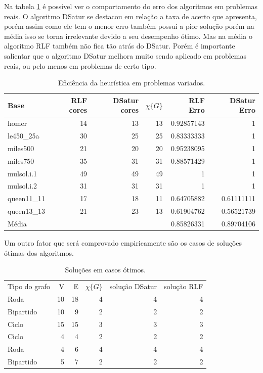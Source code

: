 \documentclass[12pt]{article}
\begin{document}
Na tabela \ref{tab:org9793e95} é possível ver o comportamento do erro dos algoritmos em problemas reais. O algoritmo DSatur se destacou em relação a taxa de acerto que apresenta, porém assim como ele tem o menor erro também possui a pior solução porém na média isso se torna irrelevante devido a seu desempenho ótimo. Mas na média o algoritmo RLF também não fica tão atrás do DSatur. Porém é importante salientar que o algoritmo DSatur melhora muito sendo aplicado em problemas reais, ou pelo menos em problemas de certo tipo.

\begin{table}[htbp]
\centering
\begin{tabular}{lrrrrr}
Base & RLF cores & DSatur cores & \(\chi\{G\}\) & RLF Erro & DSatur Erro\\
\hline
homer & 14 & 13 & 13 & 0.92857143 & 1\\
le450\_25a & 30 & 25 & 25 & 0.83333333 & 1\\
miles500 & 21 & 20 & 20 & 0.95238095 & 1\\
miles750 & 35 & 31 & 31 & 0.88571429 & 1\\
mulsol.i.1 & 49 & 49 & 49 & 1 & 1\\
mulsol.i.2 & 31 & 31 & 31 & 1 & 1\\
queen11\_11 & 17 & 18 & 11 & 0.64705882 & 0.61111111\\
queen13\_13 & 21 & 23 & 13 & 0.61904762 & 0.56521739\\
\hline
Média &  &  &  & 0.85826331 & 0.89704106\\
\end{tabular}
\caption{\label{tab:org9793e95}
Eficiência da heurística em problemas variados. \cite{instancesgraphcoloring}}

\end{table}

Um outro fator que será comprovado empiricamente são os casos de soluções ótimas dos algoritmos.
\begin{table}[htbp]
\centering
\begin{tabular}{lrrrrr}
\hline
Tipo do grafo & V & E & \(\chi\{G\}\) & solução DSatur & solução RLF\\
Roda & 10 & 18 & 4 & 4 & 4\\
Bipartido & 10 & 9 & 2 & 2 & 2\\
Ciclo & 15 & 15 & 3 & 3 & 3\\
Ciclo & 4 & 4 & 2 & 2 & 2\\
Roda & 4 & 6 & 4 & 4 & 4\\
Bipartido & 5 & 7 & 2 & 2 & 2\\
\hline
\end{tabular}
\caption{\label{tab:orgff496a1}
Soluções em casos ótimos.}

\end{table}
\end{document}
